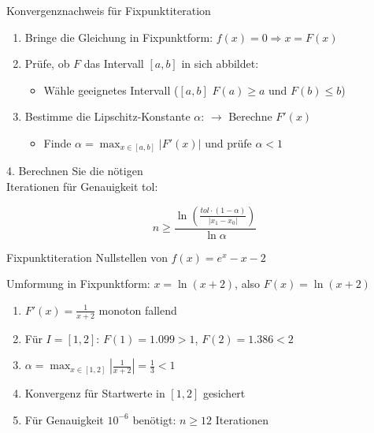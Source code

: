 \begin{KR}{Konvergenznachweis für Fixpunktiteration}
\begin{enumerate}
    \item Bringe die Gleichung in Fixpunktform: $f(x)=0 \Rightarrow x = F(x)$
    \item Prüfe, ob $F$ das Intervall $[a,b]$ in sich abbildet:
    \begin{itemize}
        \item Wähle geeignetes Intervall ($[a,b]$ $F(a) \geq a$ und $F(b) \leq b$)
    \end{itemize}
    \item Bestimme die Lipschitz-Konstante $\alpha$: $\rightarrow$ Berechne $F'(x)$
    \begin{itemize}
        \item Finde $\alpha = \max_{x \in [a,b]} |F'(x)|$ und prüfe $\alpha < 1$
    \end{itemize}
\end{enumerate}

\begin{minipage}[t]{0.5\textwidth}
    4. Berechnen Sie die nötigen \\Iterationen für Genauigkeit tol:
\end{minipage}
\begin{minipage}[t]{0.4\textwidth}
    \vspace{-3mm}
$$n \geq \frac{\ln(\frac{tol \cdot (1-\alpha)}{|x_1-x_0|})}{\ln \alpha}$$
\end{minipage}
\end{KR}

\begin{example2}{Fixpunktiteration} Nullstellen von $f(x)=e^x - x - 2$

Umformung in Fixpunktform: $x = \ln(x+2)$, also $F(x)=\ln(x+2)$
\begin{enumerate}
    \item $F'(x) = \frac{1}{x+2}$ monoton fallend
    \item Für $I=[1,2]$: $F(1)=1.099 > 1$, $F(2)=1.386 < 2$
    \item $\alpha = \max_{x \in [1,2]} |\frac{1}{x+2}| = \frac{1}{3} < 1$
    \item Konvergenz für Startwerte in $[1,2]$ gesichert
    \item Für Genauigkeit $10^{-6}$ benötigt: $n \geq 12$ Iterationen
\end{enumerate}
\end{example2}



